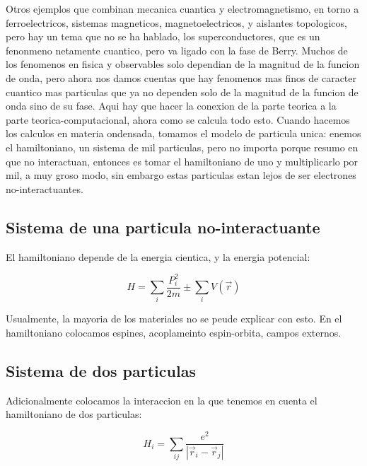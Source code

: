 \documentclass[11pt,fleqn]{book}
\begin{document}
Otros ejemplos que combinan mecanica cuantica y electromagnetismo, en torno a ferroelectricos, sistemas magneticos, magnetoelectricos, y aislantes topologicos, pero hay un tema que no se ha hablado, los superconductores, que es un fenonmeno netamente cuantico, pero va ligado con la fase de Berry. Muchos de los fenomenos en fisica y observables solo dependian de la magnitud de la funcion de onda, pero ahora nos damos cuentas que hay fenomenos mas finos de caracter cuantico mas particulas que ya no dependen solo de la magnitud de la funcion de onda sino de su fase. Aqui hay que hacer la conexion de la parte teorica a la parte teorica-computacional, ahora como se calcula todo esto. Cuando hacemos los calculos en materia ondensada, tomamos el modelo de particula unica: enemos el hamiltoniano, un sistema de mil particulas, pero no importa porque resumo en que no interactuan, entonces es tomar el hamiltoniano de uno y multiplicarlo por mil, a muy groso modo, sin embargo estas particulas estan lejos de ser electrones no-interactuantes.  

\subsection{Sistema de una particula no-interactuante}

El hamiltoniano depende de la energia cientica, y la energia potencial:

\begin{equation}
    H= \sum_{i}\frac{P_{i}^{2}}{2m}\pm\sum_{i}V(\vec{r})
\end{equation}

Usualmente, la mayoria de los materiales no se peude explicar con esto. En el hamiltoniano colocamos espines, acoplameinto espin-orbita, campos externos.

\subsection{Sistema de dos particulas}

Adicionalmente colocamos la interaccion en la que tenemos en cuenta el hamiltoniano de dos particulas:

\begin{equation}
    H_{i}=\sum_{ij}\frac{e^{2}}{|\vec{r}_{i}-\vec{r}_{j}|} 
\end{equation}
\end{document}
